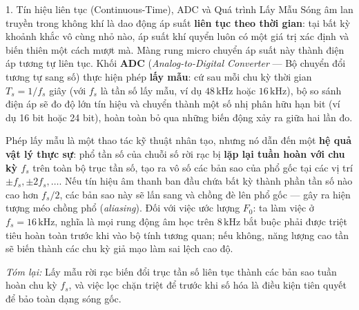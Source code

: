 \begin{feynmanbox}{1. Tín hiệu liên tục (Continuous-Time), ADC và Quá trình Lấy Mẫu}
Sóng âm lan truyền trong không khí là dao động áp suất \textbf{liên tục theo thời gian}: tại bất kỳ khoảnh khắc vô cùng nhỏ nào, áp suất khí quyển luôn có một giá trị xác định và biến thiên một cách mượt mà. Màng rung micro chuyển áp suất này thành điện áp tương tự liên tục. Khối \textbf{ADC} (\emph{Analog-to-Digital Converter} --- Bộ chuyển đổi tương tự sang số) thực hiện phép \textbf{lấy mẫu}: cứ sau mỗi chu kỳ thời gian $T_s = 1/f_s$ giây (với $f_s$ là tần số lấy mẫu, ví dụ $48\,\text{kHz}$ hoặc $16\,\text{kHz}$), bộ so sánh điện áp sẽ đo độ lớn tín hiệu và chuyển thành một số nhị phân hữu hạn bit (ví dụ 16 bit hoặc 24 bit), hoàn toàn bỏ qua những biến động xảy ra giữa hai lần đo.

Phép lấy mẫu là một thao tác kỹ thuật nhân tạo, nhưng nó dẫn đến một \textbf{hệ quả vật lý thực sự}: phổ tần số của chuỗi số rời rạc bị \textbf{lặp lại tuần hoàn với chu kỳ $f_s$} trên toàn bộ trục tần số, tạo ra vô số các bản sao của phổ gốc tại các vị trí $\pm f_s, \pm 2f_s, \dots$. Nếu tín hiệu âm thanh ban đầu chứa bất kỳ thành phần tần số nào cao hơn $f_s/2$, các bản sao này sẽ lấn sang và chồng đè lên phổ gốc --- gây ra hiện tượng méo chồng phổ (\emph{aliasing}). Đối với việc ước lượng $F_0$: ta làm việc ở $f_s = 16\,\text{kHz}$, nghĩa là mọi rung động âm học trên $8\,\text{kHz}$ bắt buộc phải được triệt tiêu hoàn toàn trước khi vào bộ tính tương quan; nếu không, năng lượng cao tần sẽ biến thành các chu kỳ giả mạo làm sai lệch cao độ.

\emph{Tóm lại:} Lấy mẫu rời rạc biến đổi trục tần số liên tục thành các bản sao tuần hoàn chu kỳ $f_s$, và việc lọc chặn triệt để trước khi số hóa là điều kiện tiên quyết để bảo toàn dạng sóng gốc.
\end{feynmanbox}

